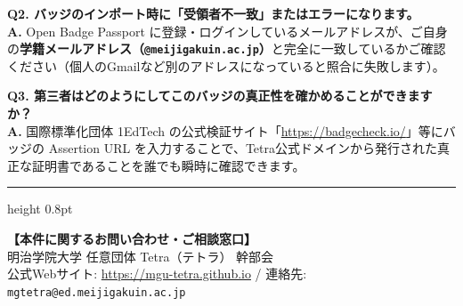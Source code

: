 \documentclass[10.5pt,a4paper]{ltjsarticle}
\begin{document}
\vspace{1.5mm}

\textbf{Q2. バッジのインポート時に「受領者不一致」またはエラーになります。} \\
\textbf{A.} Open Badge Passport に登録・ログインしているメールアドレスが、ご自身の\textbf{学籍メールアドレス（\texttt{@meijigakuin.ac.jp}）}と完全に一致しているかご確認ください（個人のGmailなど別のアドレスになっていると照合に失敗します）。

\vspace{1.5mm}

\textbf{Q3. 第三者はどのようにしてこのバッジの真正性を確かめることができますか？} \\
\textbf{A.} 国際標準化団体 1EdTech の公式検証サイト「\url{https://badgecheck.io/}」等にバッジの Assertion URL を入力することで、Tetra公式ドメインから発行された真正な証明書であることを誰でも瞬時に確認できます。

\vspace{6mm}
\hrule height 0.8pt \relax
\vspace{2.5mm}

\begin{center}
    {\fontsize{9pt}{12pt}\selectfont\color{TextSecondary}
    \textbf{【本件に関するお問い合わせ・ご相談窓口】}\\[1mm]
    明治学院大学 任意団体 Tetra（テトラ） 幹部会\\
    公式Webサイト: \url{https://mgu-tetra.github.io} \quad / \quad 連絡先: \texttt{mgtetra@ed.meijigakuin.ac.jp}
    }
\end{center}
\end{document}
